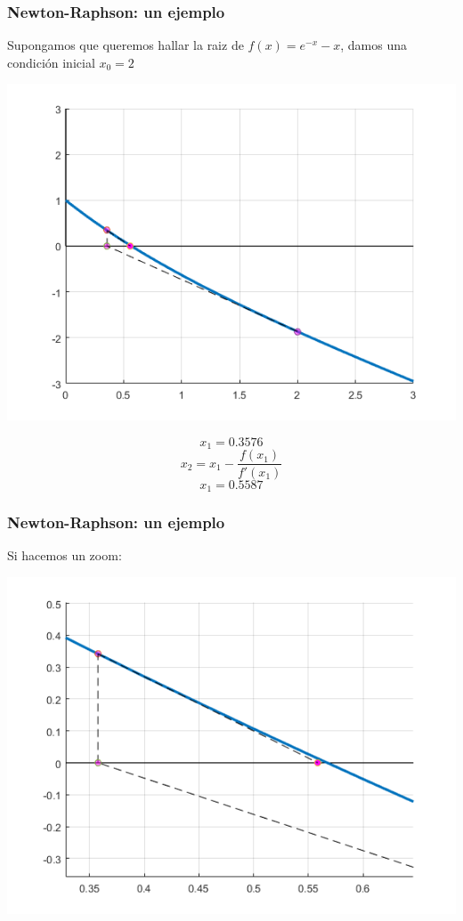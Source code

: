 \documentclass[xcolor=svgnames]{beamer} %
\theoremstyle{plain}
\theoremstyle{definition}
\begin{document}
\begin{frame}
	\frametitle{Newton-Raphson: un ejemplo}

Supongamos que queremos hallar la raiz de $f(x) = e^{-x} -x$,
damos una condición inicial $x_0=2$


\begin{minipage}{.7\linewidth}
\includegraphics[width=\linewidth]{nr_example/iter2.png} 

\end{minipage}  \begin{minipage}{.25\linewidth}

$$ x_1 = 0.3576$$
$$ x_2 = x_1 - \frac{f(x_1)}{f'(x_1)}$$
$$ x_1 = 0.5587$$
\end{minipage}
\end{frame}


\begin{frame}
	\frametitle{Newton-Raphson: un ejemplo}
Si hacemos un zoom:

\begin{minipage}{.8\linewidth}
\includegraphics[width=\linewidth]{nr_example/iter2_zoom.png} 
\end{minipage} 
\end{frame}
\end{document}

